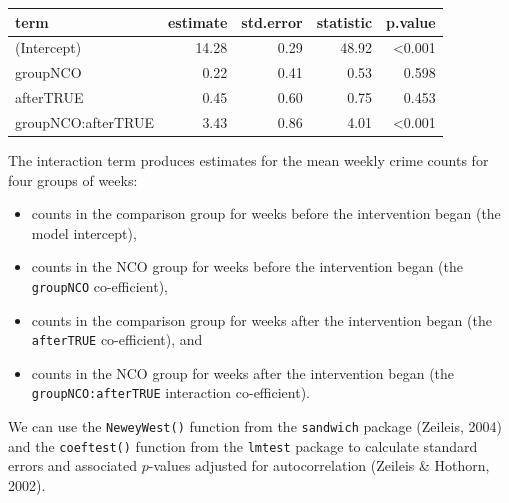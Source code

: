 \documentclass[
  english,
  man,a4paper,mask,floatsintext]{apa6}
\newenvironment{Shaded}{\begin{snugshade}}{\end{snugshade}}
\newcommand{\DataTypeTok}[1]{\textcolor[rgb]{0.13,0.29,0.53}{#1}}
\newcommand{\KeywordTok}[1]{\textcolor[rgb]{0.13,0.29,0.53}{\textbf{#1}}}
\newcommand{\NormalTok}[1]{#1}
\newcommand{\OperatorTok}[1]{\textcolor[rgb]{0.81,0.36,0.00}{\textbf{#1}}}
\newcommand{\OtherTok}[1]{\textcolor[rgb]{0.56,0.35,0.01}{#1}}
\newcommand{\StringTok}[1]{\textcolor[rgb]{0.31,0.60,0.02}{#1}}
\providecommand{\tightlist}{%
  \setlength{\itemsep}{0pt}\setlength{\parskip}{0pt}}
\begin{document}
\begin{tabular}{lrrrr}
\toprule
term & estimate & std.error & statistic & p.value\\
\midrule
(Intercept) & 14.28 & 0.29 & 48.92 & <0.001\\
groupNCO & 0.22 & 0.41 & 0.53 & 0.598\\
afterTRUE & 0.45 & 0.60 & 0.75 & 0.453\\
groupNCO:afterTRUE & 3.43 & 0.86 & 4.01 & <0.001\\
\bottomrule
\end{tabular}

\normalsize

The interaction term produces estimates for the mean weekly crime counts for four groups of weeks:

\begin{itemize}
\tightlist
\item
  counts in the comparison group for weeks before the intervention began (the model intercept),
\item
  counts in the NCO group for weeks before the intervention began (the \texttt{groupNCO} co-efficient),
\item
  counts in the comparison group for weeks after the intervention began (the \texttt{afterTRUE} co-efficient), and
\item
  counts in the NCO group for weeks after the intervention began (the \texttt{groupNCO:afterTRUE} interaction co-efficient).
\end{itemize}

We can use the \texttt{NeweyWest()} function from the \texttt{sandwich} package (Zeileis, 2004) and the \texttt{coeftest()} function from the \texttt{lmtest} package to calculate standard errors and associated \(p\)-values adjusted for autocorrelation (Zeileis \& Hothorn, 2002).

\footnotesize

\begin{Shaded}
\end{Shaded}
\end{document}
